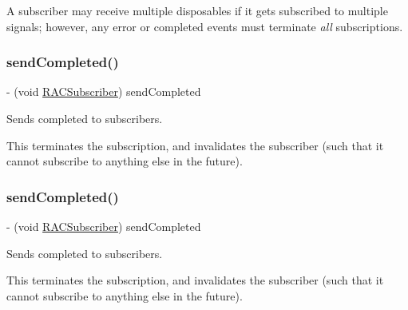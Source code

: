 A subscriber may receive multiple disposables if it gets subscribed to multiple signals; however, any error or completed events must terminate {\itshape all} subscriptions. \mbox{\label{protocol_r_a_c_subscriber_01-p_a5dafeaf878cebf8834fc7b8039550a43}} 
\subsubsection{\texorpdfstring{send\+Completed()}{sendCompleted()}\hspace{0.1cm}{\footnotesize\ttfamily [1/3]}}
{\footnotesize\ttfamily -\/ (void \mbox{\hyperlink{interface_r_a_c_subscriber}{R\+A\+C\+Subscriber}}) send\+Completed \begin{DoxyParamCaption}{ }\end{DoxyParamCaption}\hspace{0.3cm}{\ttfamily [required]}}

Sends completed to subscribers.

This terminates the subscription, and invalidates the subscriber (such that it cannot subscribe to anything else in the future). \mbox{\label{protocol_r_a_c_subscriber_01-p_a5dafeaf878cebf8834fc7b8039550a43}} 
\subsubsection{\texorpdfstring{send\+Completed()}{sendCompleted()}\hspace{0.1cm}{\footnotesize\ttfamily [2/3]}}
{\footnotesize\ttfamily -\/ (void \mbox{\hyperlink{interface_r_a_c_subscriber}{R\+A\+C\+Subscriber}}) send\+Completed \begin{DoxyParamCaption}{ }\end{DoxyParamCaption}\hspace{0.3cm}{\ttfamily [required]}}

Sends completed to subscribers.

This terminates the subscription, and invalidates the subscriber (such that it cannot subscribe to anything else in the future). \mbox{\label{protocol_r_a_c_subscriber_01-p_a5dafeaf878cebf8834fc7b8039550a43}} 
